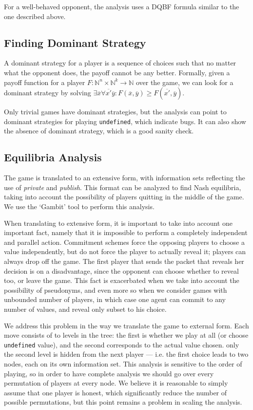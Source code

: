 \documentclass[acmsmall,review,anonymous]{acmart}\settopmatter{printfolios=true,printccs=false,printacmref=false}
\begin{document}
For a well-behaved opponent, the analysis uses a DQBF formula similar to the one described above.

\subsection{Finding Dominant Strategy}
A dominant strategy for a player is a sequence of choices such that no matter what the opponent does, the payoff cannot be any better. Formally, given a payoff function for a player 
$F : \mathbb{N}^n \times \mathbb{N}^k \rightarrow \mathbb{N}$ 
over the game, we can look for a dominant strategy by solving
$\exists \overline{x} \forall \overline{x'} \overline{y}: F(\overline{x}, \overline{y})\geq F(\overline{x'}, \overline{y})$.

Only trivial games have dominant strategies, but the analysis can point to dominant strategies for playing \texttt{undefined}, which indicate bugs. It can also show the absence of dominant strategy, which is a good sanity check.

\subsection{Equilibria Analysis}
The game is translated to an extensive form, with information sets reflecting the use of \emph{private} and \emph{publish}. 
This format can be analyzed to find Nash equilibria, taking into account the possibility of players quitting in the middle of the game. We use the `Gambit' tool to perform this analysis.

When translating to extensive form, it is important to take into account one important fact, namely that it is impossible to perform a completely independent and parallel action. Commitment schemes force the opposing players to choose a value independently, but do not force the player to actually reveal it; players can always drop off the game. The first player that sends the packet that reveals her decision is on a disadvantage, since the opponent can choose whether to reveal too, or leave the game. This fact is exacerbated when we take into account the possibility of pseudonyms, and even more so when we consider games with unbounded number of players, in which case one agent can commit to any number of values, and reveal only subset to his choice.

We address this problem in the way we translate the game to external form. Each move consists of to levels in the tree: the first is whether we play at all (or choose \texttt{undefined} value), and the second corresponds to the actual value chosen. only the second level is hidden from the next player --- i.e. the first choice leads to two nodes, each on its own information set. This analysis is sensitive to the order of playing, so in order to have complete analysis we should go over every permutation of players at every node. We believe it is reasonable to simply assume that one player is honest, which significantly reduce the number of possible permutations, but this point remains a problem in scaling the analysis.
\end{document}
